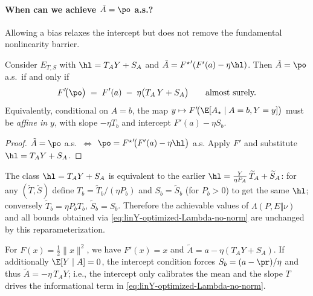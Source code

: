 \paragraph{When can we achieve \texorpdfstring{$\tilde{A}=\po$}{A\_tilde=po} a.s.?}
Allowing a bias relaxes the intercept but does not remove the fundamental
nonlinearity barrier.

\begin{proposition}
    \label{prop:linY-iff-no-norm}
    Consider $E_{T,S}$ with $\hl=T_A Y + S_A$ and
    $\tilde{A}={F^\star}'(F'(a)-\eta \hl)$. Then $\tilde{A}=\po$ a.s.\ if and only if
    \begin{equation}
        \label{eq:affine-dual-linY-no-norm}
        F'\!\big(\po\big)
        \;=\;
        F'(a) \;-\; \eta\big(T_A\,Y + S_A\big)
        \qquad\text{almost surely.}
    \end{equation}
    Equivalently, conditional on $A=b$, the map
    $y\mapsto F'\!\big(\E[A_\star\mid A=b,Y=y]\big)$ must be \emph{affine in $y$},
    with slope $-\eta T_b$ and intercept $F'(a)-\eta S_b$.
\end{proposition}

\begin{proof}
    $\tilde{A}=\po$ a.s.\ $\iff$
    $\po={F^\star}'\!\big(F'(a)-\eta \hl\big)$ a.s.  Apply $F'$ and substitute
    $\hl=T_A Y + S_A$.
\end{proof}

\begin{remark}
    \label{rem:linY-absorb}
    The class $\hl=T_A Y+S_A$ is equivalent to the earlier
    $\hl=\frac{Y}{\eta P_A}\,\widetilde{T}_A+\widetilde{S}_A$:
    for any $(\widetilde{T},\widetilde{S})$ define
    $T_b=\widetilde{T}_b/(\eta P_b)$ and $S_b=\widetilde{S}_b$ (for $P_b>0$) to get
    the same $\hl$; conversely $\widetilde{T}_b=\eta P_b T_b$,
    $\widetilde{S}_b=S_b$.  Therefore the achievable values of
    $\Lambda(P,E\Vert \nu)$ and all bounds obtained via
    \eqref{eq:linY-optimized-Lambda-no-norm} are unchanged by this reparameterization.
\end{remark}

\begin{remark}
    For $F(x)=\frac12\|x\|^2$, we have $F'(x)=x$ and
    $\tilde{A}=a-\eta(T_A Y+S_A)$.  If additionally $\E[Y\mid A]=0$, the
    intercept condition forces $S_b=(a-\pr)/\eta$ and thus
    $\tilde{A}=-\eta\,T_A Y$; i.e., the intercept only calibrates the mean and the
    slope $T$ drives the informational term in
    \eqref{eq:linY-optimized-Lambda-no-norm}.
\end{remark}

